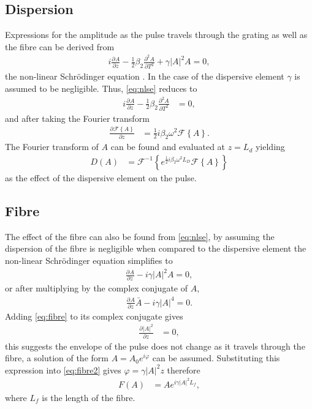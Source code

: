 \documentclass[12pt]{article}
\newcommand{\pdiff}[3][]{\frac{\partial^{#1}#2}{\partial{#3}^{#1}}}
\newcommand{\FT}[1]{\mathcal{F}\left\{ #1 \right\}}
\newcommand{\FTi}[1]{\mathcal{F}^{-1}\left\{ #1 \right\}}
\begin{document}
\subsection{Dispersion}
Expressions for the amplitude as the pulse travels through the grating as well as the fibre can be derived from
\begin{align}
\label{eq:nlse}
i \pdiff{A}{z} - \frac{1}{2} \beta_2 \pdiff[2]{A}{T} + \gamma |A|^2 A = 0,
\end{align}
the non-linear Schr\"{o}dinger equation \cite{ferreira}. In the case of the dispersive element $\gamma$ is assumed to be negligible. Thus, \eqref{eq:nlse} reduces to
\begin{align*}
i \pdiff{A}{z} - \frac{1}{2} \beta_2 \pdiff[2]{A}{T} &= 0,
\end{align*}
and after taking the Fourier transform
\begin{align*}
\pdiff{\FT{A}}{z} &= \frac{1}{2} i \beta_2 \omega^2 \FT{A}.
\end{align*}
The Fourier transform of $A$ can be found and evaluated at $z = L_d$ yielding
\begin{align*}
D(A) &= \FTi{e^{\frac{1}{2} i \beta_2 \omega^2 L_D} \FT{A}}
\end{align*}
as the effect of the dispersive element on the pulse.

\subsection{Fibre}
The effect of the fibre can also be found from \eqref{eq:nlse}, by assuming the dispersion of the fibre is negligible when compared to the dispersive element the non-linear Schr\"{o}dinger equation simplifies to
\begin{align*}
\pdiff{A}{z} - i \gamma |A|^2 A = 0,
\end{align*}
or after multiplying by the complex conjugate of $A$,
\begin{align}
\label{eq:fibre}
\pdiff{A}{z}\bar{A} - i \gamma |A|^4 = 0.
\end{align}
Adding \eqref{eq:fibre} to its complex conjugate gives
\begin{align}
\label{eq:fibre2}
\pdiff{|A|^2}{z} &= 0,
\end{align}
this suggests the envelope of the pulse does not change as it travels through the fibre, a solution of the form $A = A_0 e^{i \varphi}$ can be assumed. Substituting this expression into \eqref{eq:fibre2} gives $\varphi = \gamma |A|^2 z$ therefore
\begin{align*}
F(A) &= A e^{i \gamma |A|^2 L_f},
\end{align*}
where $L_f$ is the length of the fibre.
\end{document}
